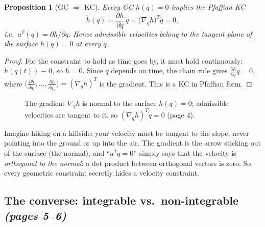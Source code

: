 \documentclass[11pt,a4paper]{article}
\theoremstyle{definition}
\theoremstyle{plain}
\newtheorem{proposition}[definition]{Proposition}
\begin{document}
\begin{proposition}[GC $\Rightarrow$ KC]\label{prop:gckc}
Every GC $h(q)=0$ implies the Pfaffian KC
\[
\dot h(q)=\frac{\partial h}{\partial q}\,\dot q=\bigl(\nabla_q h\bigr)^{T}\dot q=0 ,
\]
i.e.\ $a^{T}(q)=\partial h/\partial q$. Hence admissible velocities belong to the tangent plane of the surface $h(q)=0$ at every $q$.
\end{proposition}
\begin{proof}
For the constraint to hold as time goes by, it must hold continuously: $h(q(t))\equiv0$, so $\dot h=0$. Since $q$ depends on time, the chain rule gives $\frac{\partial h}{\partial q}\dot q=0$, where $\bigl(\frac{\partial h}{\partial q_1},\dots,\frac{\partial h}{\partial q_n}\bigr)=(\nabla_q h)^{T}$ is the gradient. This is a KC in Pfaffian form.
\end{proof}
 
\begin{figure}[H]
\centering
{}
\caption{The gradient $\nabla_q h$ is normal to the surface $h(q)=0$; admissible velocities are tangent to it, so $(\nabla_q h)^{T}\dot q=0$ (page 4).}
\end{figure}
 
\begin{intuition}
Imagine hiking on a hillside: your velocity must be tangent to the slope, never pointing into the ground or up into the air. The gradient is the arrow sticking out of the surface (the normal), and ``$a^{T}\dot q=0$'' simply says that the velocity is \emph{orthogonal to the normal}: a dot product between orthogonal vectors is zero. So every geometric constraint secretly hides a velocity constraint.
\end{intuition}
 
\subsection{The converse: integrable vs.\ non-integrable \emph{(pages 5--6)}}
 
\end{document}
